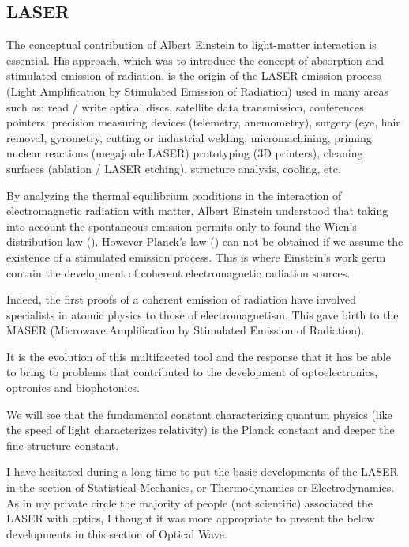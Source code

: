 	\subsection{LASER}
	The conceptual contribution of Albert Einstein to light-matter interaction is essential. His approach, which was to introduce the concept of absorption and stimulated emission of radiation, is the origin of the LASER emission process (Light Amplification by Stimulated Emission of Radiation) used in many areas such as: read / write optical discs, satellite data transmission, conferences pointers, precision measuring devices (telemetry, anemometry), surgery (eye, hair removal, gyrometry, cutting or industrial welding, micromachining, priming nuclear reactions (megajoule  LASER) prototyping (3D printers), cleaning surfaces (ablation / LASER etching), structure analysis, cooling, etc.

	By analyzing the thermal equilibrium conditions in the interaction of electromagnetic radiation with matter, Albert Einstein understood that taking into account the spontaneous emission permits only to found the Wien's distribution law (). However Planck's law () can not be obtained if we assume the existence of a stimulated emission process. This is where Einstein's work germ contain the development of coherent electromagnetic radiation sources.

	Indeed, the first proofs of a coherent emission of radiation have involved specialists in atomic physics to those of electromagnetism. This gave birth to the MASER (Microwave Amplification by Stimulated Emission of Radiation).

	It is the evolution of this multifaceted tool and the response that it has be able to bring to problems that contributed to the development of optoelectronics, optronics and biophotonics.
	
	\begin{tcolorbox}[title=Remark,colframe=black,arc=10pt]
	We will see that the fundamental constant characterizing quantum physics (like the speed of light characterizes relativity) is the Planck constant and deeper the fine structure constant.
	\end{tcolorbox}
	I have hesitated during a long time to put the basic developments of the LASER in the section of Statistical Mechanics, or Thermodynamics or Electrodynamics. As in my private circle the majority of people (not scientific) associated the LASER with optics, I thought it was more appropriate to present the below developments in this section of Optical Wave.
	
